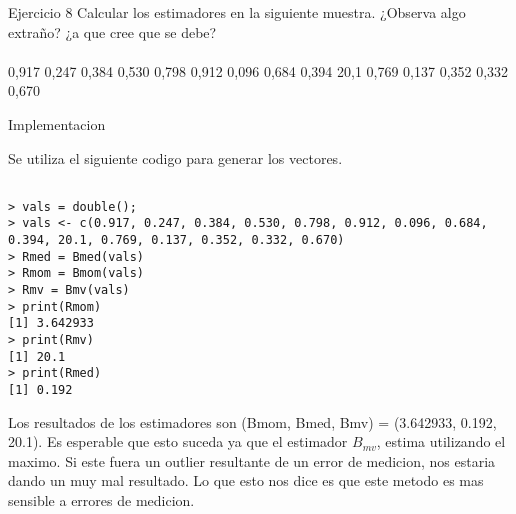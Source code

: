 



\begin{section}{Ejercicio 8}
Calcular los estimadores en la siguiente muestra. ¿Observa algo extraño? ¿a que cree que se
debe? \\
~\\
0,917 0,247 0,384 0,530 0,798 0,912 0,096 0,684 0,394 20,1 0,769 0,137 0,352 0,332 0,670

\begin{subsection}{Implementacion}


Se utiliza el siguiente codigo para generar los vectores.
\begin{verbatim}

> vals = double();
> vals <- c(0.917, 0.247, 0.384, 0.530, 0.798, 0.912, 0.096, 0.684, 0.394, 20.1, 0.769, 0.137, 0.352, 0.332, 0.670)
> Rmed = Bmed(vals)
> Rmom = Bmom(vals)
> Rmv = Bmv(vals)
> print(Rmom)
[1] 3.642933
> print(Rmv)
[1] 20.1
> print(Rmed)
[1] 0.192
\end{verbatim}
Los resultados de los estimadores son (Bmom, Bmed, Bmv) = (3.642933, 0.192, 20.1). Es esperable que esto suceda ya que el estimador $B_{mv}$, estima utilizando el maximo. Si este fuera un outlier resultante de un error de medicion, nos estaria dando un muy mal resultado. Lo que esto nos dice es que este metodo es mas sensible a errores de medicion.


\end{subsection}
\end{section}